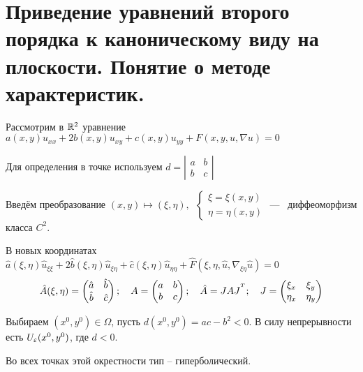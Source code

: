 \documentclass[../main.tex]{subfiles}
\begin{document}
\section[Приведение уравнений второго порядка к каноническому виду на плоскости]{Приведение уравнений второго порядка к каноническому виду на плоскости. Понятие о методе характеристик.}



Рассмотрим в $\mathbb{R}^2$ уравнение 
$a(x,y)u_{xx} + 2b(x,y)u_{xy} + c(x,y)u_{yy} + F(x,y,u,\nabla u) = 0$

Для определения в точке используем $d = 
\left|
  \begin{array}{cc}
    a & b \\
    b & c  
  \end{array} 
\right| $

Введём преобразование 
$ (x,y) \mapsto (\xi, \eta),\;\ 
\begin{cases}
  \xi  = \xi(x, y) \\
  \eta = \eta(x, y)
\end{cases}$%
--- \ диффеоморфизм класса $C^2$.

В новых координатах \ 
$\hat{a}(\xi,\eta) \hat{u}_{\xi\xi}   +
2\hat{b}(\xi,\eta) \hat{u}_{\xi\eta}  +
 \hat{c}(\xi,\eta) \hat{u}_{\eta\eta} +
\hat{F}(\xi,\eta,\hat{u},\nabla_{\xi\eta}\hat{u}) = 0$
%
$$\hat{A}(\xi, \eta) = 
\begin{pmatrix}
  \hat{a} & \hat{b} \\
  \hat{b} & \hat{c}
\end{pmatrix}; 
%
\quad A = 
\begin{pmatrix}
  a & b \\
  b & c
\end{pmatrix};
%
\quad \hat{A} = JAJ^\Transp;
\quad J = 
\begin{pmatrix}
  \xi_x  & \xi_y \\
  \eta_x & \eta_y
\end{pmatrix}$$



Выбираем $(x^0, y^0) \in \Omega$, 
пусть $d(x^0, y^0) = ac - b^2 < 0$. 
В силу непрерывности есть $U_\varepsilon(x^0, y^0)$, где $d < 0$.

Во всех точках этой окрестности тип -- гиперболический.
\end{document}
